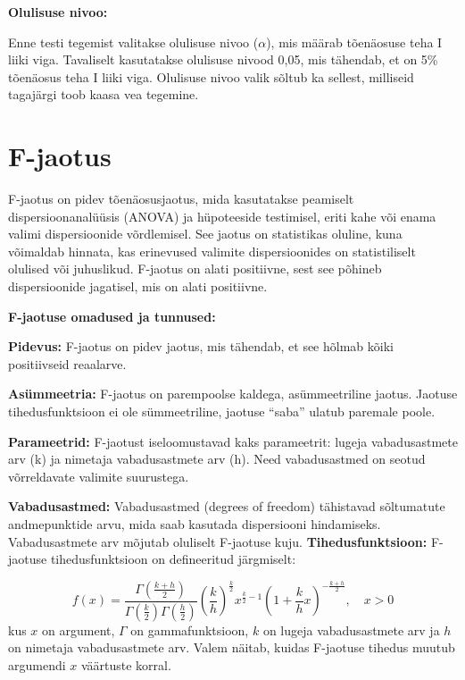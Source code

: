 \documentclass[
]{book}
\theoremstyle{definition}
\theoremstyle{definition}
\theoremstyle{definition}
\theoremstyle{definition}
\theoremstyle{remark}
\begin{document}
\textbf{Olulisuse nivoo:}

Enne testi tegemist valitakse olulisuse nivoo (\(\alpha\)), mis määrab tõenäosuse teha I liiki viga. Tavaliselt kasutatakse olulisuse nivood 0,05, mis tähendab, et on 5\% tõenäosus teha I liiki viga. Olulisuse nivoo valik sõltub ka sellest, milliseid tagajärgi toob kaasa vea tegemine.

\section{F-jaotus}\label{f-jaotus}

F-jaotus on pidev tõenäosusjaotus, mida kasutatakse peamiselt dispersioonanalüüsis (ANOVA) ja hüpoteeside testimisel, eriti kahe või enama valimi dispersioonide võrdlemisel. See jaotus on statistikas oluline, kuna võimaldab hinnata, kas erinevused valimite dispersioonides on statistiliselt olulised või juhuslikud. F-jaotus on alati positiivne, sest see põhineb dispersioonide jagatisel, mis on alati positiivne.

\textbf{F-jaotuse omadused ja tunnused:}

\textbf{Pidevus:} F-jaotus on pidev jaotus, mis tähendab, et see hõlmab kõiki positiivseid reaalarve.

\textbf{Asümmeetria:} F-jaotus on parempoolse kaldega, asümmeetriline jaotus. Jaotuse tihedusfunktsioon ei ole sümmeetriline, jaotuse ``saba'' ulatub paremale poole.

\textbf{Parameetrid:} F-jaotust iseloomustavad kaks parameetrit: lugeja vabadusastmete arv (k) ja nimetaja vabadusastmete arv (h). Need vabadusastmed on seotud võrreldavate valimite suurustega.

\textbf{Vabadusastmed:} Vabadusastmed (degrees of freedom) tähistavad sõltumatute andmepunktide arvu, mida saab kasutada dispersiooni hindamiseks. Vabadusastmete arv mõjutab oluliselt F-jaotuse kuju.
\textbf{Tihedusfunktsioon:} F-jaotuse tihedusfunktsioon on defineeritud järgmiselt:

\[f(x) = \frac{\Gamma\left(\frac{k + h}{2}\right)}{\Gamma\left(\frac{k}{2}\right) \Gamma\left(\frac{h}{2}\right)} \left(\frac{k}{h}\right)^{\frac{k}{2}} x^{\frac{k}{2} - 1} \left(1 + \frac{k}{h} x\right)^{-\frac{k + h}{2}}, \quad x > 0\]
kus \(x\) on argument, \(\Gamma\) on gammafunktsioon, \(k\) on lugeja vabadusastmete arv ja \(h\) on nimetaja vabadusastmete arv. Valem näitab, kuidas F-jaotuse tihedus muutub argumendi \(x\) väärtuste korral.
\end{document}
